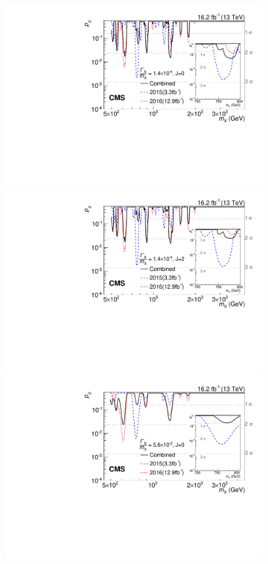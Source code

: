 \begin{figure}[htb]
    \centering
    \includegraphics[width=\cmsFigWidth]{Figure_005-a.pdf}
    \includegraphics[width=\cmsFigWidth]{Figure_005-b.pdf}  \\[0.5ex]
    \includegraphics[width=\cmsFigWidth]{Figure_005-c.pdf}

\end{figure}
